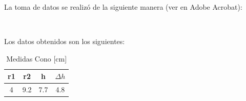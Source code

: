 La toma de datos se realizó de la siguiente manera (ver en Adobe Acrobat):

\begin{center}
    \\
\end{center}

\newpage
Los datos obtenidos son los siguientes:

\begin{table}[H]
    \centering
    \caption{Medidas Cono [cm]}
    \begin{tabular}{|c|c|c|c|}
    \hline
    r1 & r2 & h & $\Delta h$ \\ \hline
    4 & 9.2 & 7.7 & 4.8 \\ \hline
    \end{tabular}\\
    \label{tab:permeabilidad}
\end{table}

